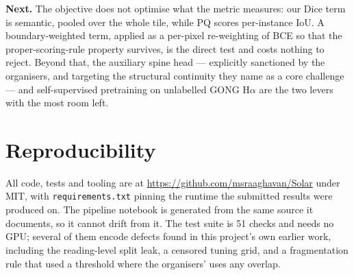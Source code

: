 \textbf{Next.} The objective does not optimise what the metric measures: our
Dice term is semantic, pooled over the whole tile, while PQ scores per-instance
IoU. A boundary-weighted term, applied as a per-pixel re-weighting of BCE so
that the proper-scoring-rule property survives, is the direct test and costs
nothing to reject. Beyond that, the auxiliary spine head --- explicitly
sanctioned by the organisers, and targeting the structural continuity they name
as a core challenge --- and self-supervised pretraining on unlabelled GONG
H$\alpha$ are the two levers with the most room left.

\section{Reproducibility}

All code, tests and tooling are at \url{https://github.com/msraaghavan/Solar}
under MIT, with \texttt{requirements.txt} pinning the runtime the submitted
results were produced on. The pipeline notebook is generated from the same
source it documents, so it cannot drift from it. The test suite is 51 checks
and needs no GPU; several of them encode defects found in this project's own
earlier work, including the reading-level split leak, a censored tuning grid,
and a fragmentation rule that used a threshold where the organisers' uses any
overlap.
